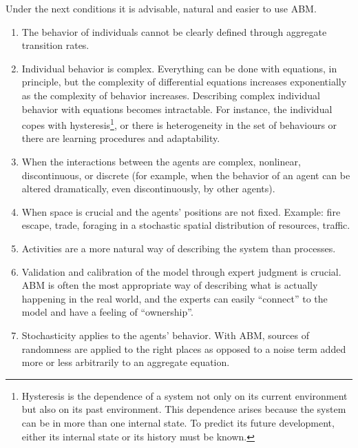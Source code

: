 \documentclass[11pt,oneside,a4paper,openright]{report}
\begin{document}

Under the next conditions it is advisable, natural and easier to use ABM.

\begin{enumerate}[i-] 
\item The behavior of individuals cannot be clearly defined through aggregate transition rates.
\item Individual behavior is complex. Everything can be done with equations, in principle, but the complexity of differential equations increases exponentially as the complexity of behavior increases. Describing complex individual behavior with equations becomes intractable. For instance, the individual copes with hysteresis\footnote{Hysteresis is the dependence of a system not only on its current environment but also on its past environment. This dependence arises because the system can be in more than one internal state. To predict its future development, either its internal state or its history must be known\cite[p.571–597]{hysteresisDef}.}, or there is heterogeneity in the set of behaviours or there are learning procedures and adaptability.
\item When the interactions between the agents are complex, nonlinear, discontinuous, or discrete (for example, when the behavior of an agent can be altered dramatically, even discontinuously, by other agents).
\item When space is crucial and the agents' positions are not fixed. Example: fire escape, trade, foraging in a stochastic spatial distribution of resources, traffic.
\item Activities are a more natural way of describing the system than processes.
\item Validation and calibration of the model through expert judgment is crucial. ABM is often the most appropriate way of describing what is actually happening in the real world, and the experts can easily “connect” to the model and have a feeling of “ownership”. 
\item Stochasticity applies to the agents' behavior. With ABM, sources of randomness are applied to the right places as opposed to a noise term added more or less arbitrarily to an aggregate equation. 
\end{enumerate}
\end{document}
